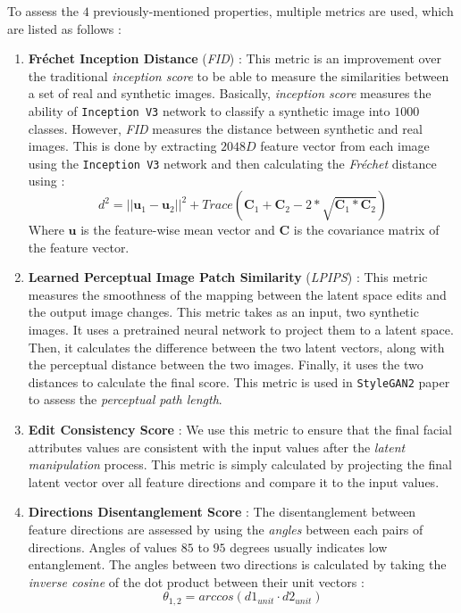 To assess the $4$ previously-mentioned properties, multiple metrics are used, which are listed as follows :
\begin{enumerate}
    \item \textbf{Fréchet Inception Distance} (\emph{FID}) \cite{heusel2018gans} : This metric is an improvement over the traditional \emph{inception score} to be able to measure the similarities between a set of real and synthetic images. Basically, \emph{inception score} measures the ability of \texttt{Inception V3} network \cite{szegedy2014going} to classify a synthetic image into $1000$ classes. However, \emph{FID} measures the distance between synthetic and real images. This is done by extracting $2048D$ feature vector from each image using the \texttt{Inception V3} network and then calculating the \emph{Fréchet} distance using :
    \begin{equation}
        d^2 = ||\textbf{u}_{1} - \textbf{u}_{2}||^2 + Trace(\textbf{C}_{1} + \textbf{C}_{2} - 2 * \sqrt{\textbf{C}_{1} * \textbf{C}_{2}})
    \end{equation}
    Where $\textbf{u}$ is the feature-wise mean vector and $\textbf{C}$ is the covariance matrix of the feature vector.
    
    \item \textbf{Learned Perceptual Image Patch Similarity} (\emph{LPIPS}) \cite{zhang2018unreasonable} : This metric measures the smoothness of the mapping between the latent space edits and the output image changes. This metric takes as an input, two synthetic images. It uses a pretrained neural network to project them to a latent space. Then, it calculates the difference between the two latent vectors, along with the perceptual distance between the two images. Finally, it uses the two distances to calculate the final score. This metric is used in \texttt{StyleGAN2} paper to assess the \emph{perceptual path length}.
    
    \item \textbf{Edit Consistency Score} : We use this metric to ensure that the final facial attributes values are consistent with the input values after the \emph{latent manipulation} process. This metric is simply calculated by projecting the final latent vector over all feature directions and compare it to the input values.
    
    \item \textbf{Directions Disentanglement Score} : The disentanglement between feature directions are assessed by using the \emph{angles} between each pairs of directions. Angles of values $85$ to $95$ degrees usually indicates low entanglement. The angles between two directions is calculated by taking the \emph{inverse cosine} of the dot product between their unit vectors :
    \begin{equation}
        \theta_{1,2} = arccos(d1_{unit} \cdot d2_{unit})
    \end{equation}
\end{enumerate}

